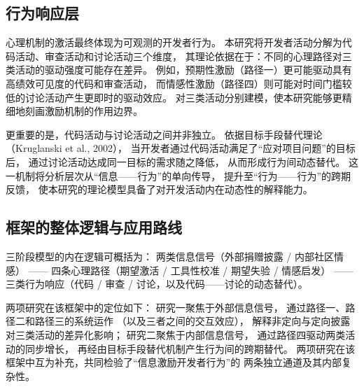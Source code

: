\documentclass[
    type = master, %
    degree = professional,        %
    decl-page,  %
    twoside,                %
    fontset = fandol %
  ]{njuthesis}
\begin{document}
\subsection{行为响应层}

心理机制的激活最终体现为可观测的开发者行为。
本研究将开发者活动分解为代码活动、审查活动和讨论活动三个维度，
其理论依据在于：不同的心理路径对三类活动的驱动强度可能存在差异。
例如，预期性激励（路径一）更可能驱动具有高绩效可见度的代码和审查活动，
而情感性激励（路径四）则可能对时间门槛较低的讨论活动产生更即时的驱动效应。
对三类活动分别建模，使本研究能够更精细地刻画激励机制的作用边界。

更重要的是，代码活动与讨论活动之间并非独立。
依据目标手段替代理论（Kruglanski et al., 2002）\cite{kruglanski2002theory}，
当开发者通过代码活动满足了``应对项目问题''的目标后，
通过讨论活动达成同一目标的需求随之降低，
从而形成行为间动态替代。
这一机制将分析层次从``信息——行为''的单向传导，
提升至``行为——行为''的跨期反馈，
使本研究的理论模型具备了对开发活动内在动态性的解释能力。

\subsection{框架的整体逻辑与应用路线}

三阶段模型的内在逻辑可概括为：
两类信息信号（外部捐赠披露 / 内部社区情感）
—— 四条心理路径（期望激活 / 工具性校准 / 期望失验 / 情感启发）
—— 三类行为响应（代码 / 审查 / 讨论，以及代码——讨论的动态替代）。

两项研究在该框架中的定位如下：
研究一聚焦于外部信息信号，
通过路径一、路径二和路径三的系统运作
（以及三者之间的交互效应），
解释非定向与定向披露对三类活动的差异化影响；
研究二聚焦于内部信息信号，
通过路径四驱动两类活动的同步增长，
再经由目标手段替代机制产生行为间的跨期替代。
两项研究在该框架中互为补充，共同检验了``信息激励开发者行为''的
两条独立通道及其内部复杂性。
\end{document}
